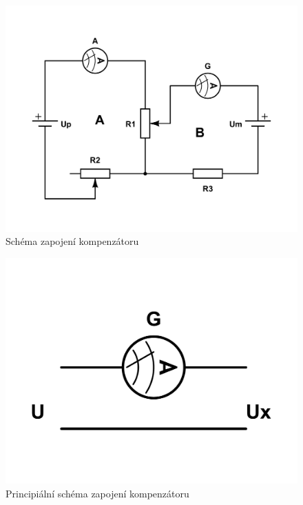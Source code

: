 \documentclass[english]{article}
\begin{document}
\begin{figure}[h!]
\centering
  \includegraphics[scale=0.4, trim=0cm 3cm 0cm 3cm, clip=true]{att/7_s_zapojeni_kompenzatoru.pdf}
  \caption{Schéma zapojení kompenzátoru}
  \label{fig:s_zapojeni_kompenzatoru}
\end{figure}

\begin{figure}[h!]
\centering
  \includegraphics[scale=0.2, trim=0cm 5cm 0cm 5cm, clip=true]{att/7_s_princip_kompenzatoru.pdf}
  \caption{Principiální schéma zapojení kompenzátoru}
  \label{fig:s_princip_kompenzatoru}
\end{figure}
\end{document}

